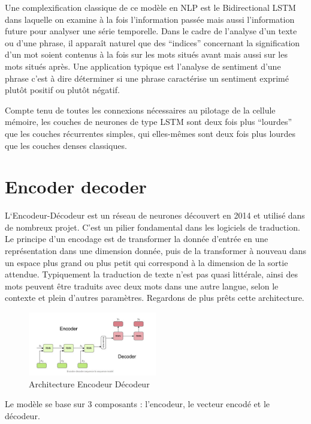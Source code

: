 \documentclass[8pt]{article}
\begin{document}
    Une complexification classique de ce modèle en NLP est le Bidirectional
LSTM dans laquelle on examine à la fois l'information passée mais aussi
l'information future pour analyser une série temporelle. Dans le cadre
de l'analyse d'un texte ou d'une phrase, il apparaît naturel que des
``indices'' concernant la signification d'un mot soient contenus à la
fois sur les mots situés avant mais aussi sur les mots situés après. Une
application typique est l'analyse de sentiment d'une phrase c'est à dire
déterminer si une phrase caractérise un sentiment exprimé plutôt positif
ou plutôt négatif.

Compte tenu de toutes les connexions nécessaires au pilotage de la
cellule mémoire, les couches de neurones de type LSTM sont deux fois
plus ``lourdes'' que les couches récurrentes simples, qui elles-mêmes
sont deux fois plus lourdes que les couches denses classiques.

    \hypertarget{encoder-decoder}{%
\section{Encoder decoder}\label{encoder-decoder}}

    L`Encodeur-Décodeur est un réseau de neurones découvert en 2014 et
utilisé dans de nombreux projet. C'est un pilier fondamental dans les
logiciels de traduction. Le principe d'un encodage est de transformer la
donnée d'entrée en une représentation dans une dimension donnée, puis de
la transformer à nouveau dans un espace plus grand ou plus petit qui
correspond à la dimension de la sortie attendue. Typiquement la
traduction de texte n'est pas quasi littérale, ainsi des mots peuvent
être traduits avec deux mots dans une autre langue, selon le contexte et
plein d'autres paramètres. Regardons de plus prêts cette architecture.

\begin{figure}
\centering
\includegraphics[width=0.5\textwidth]{blog-17-3-5.jpg}
\caption{Architecture Encodeur Décodeur}
\end{figure}

Le modèle se base sur 3 composants : l'encodeur, le vecteur encodé et le
décodeur.
\end{document}
